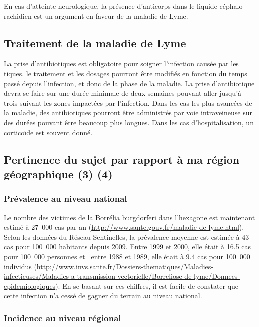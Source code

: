 \documentclass[12pt,a4wide]{article}
\begin{document}
En cas d'atteinte neurologique, la présence d'anticorps dans le liquide céphalo-rachidien est un argument en faveur de la maladie de Lyme.


\subsection{Traitement de la maladie de Lyme}
\label{sec-3-5}

La prise d'antibiotiques est obligatoire pour soigner l'infection causée par les tiques. le traitement et les dosages pourront être modifiés en fonction du temps passé depuis l'infection, et donc de la phase de la maladie. La prise d'antibiotique devra se faire sur une durée minimale de deux semaines pouvant aller jusqu'à trois suivant les zones impactées par l'infection.
Dans les cas les plus avancées de la maladie, des antibiotiques pourront être administrés par voie intraveineuse sur des durées pouvant être beaucoup plus longues. Dans les cas d'hospitalisation, un corticoïde est souvent donné. 




\subsection{Pertinence du sujet par rapport à ma région géographique (3) (4)}
\label{sec-3-6}


\subsubsection{Prévalence au niveau national}
\label{sec-3-6-1}

Le nombre des victimes de la Borrélia burgdorferi dans l'hexagone est maintenant estimé à 27 000 cas par an (\url{http://www.sante.gouv.fr/maladie-de-lyme.html}). Selon les données du Réseau Sentinelles, la prévalence moyenne est estimée à 43 cas pour 100 000 habitants depuis 2009. Entre 1999 et 2000, elle était à 16.5 cas pour 100 000 personnes et  entre 1988 et 1989, elle était à 9.4 cas pour 100 000 individus (\url{http://www.invs.sante.fr/Dossiers-thematiques/Maladies-infectieuses/Maladies-a-transmission-vectorielle/Borreliose-de-lyme/Donnees-epidemiologiques}). En se basant sur ces chiffres, il est facile de constater que  cette infection n'a cessé de gagner du terrain au niveau national.

\subsubsection{Incidence au niveau régional}
\label{sec-3-6-2}
\end{document}
